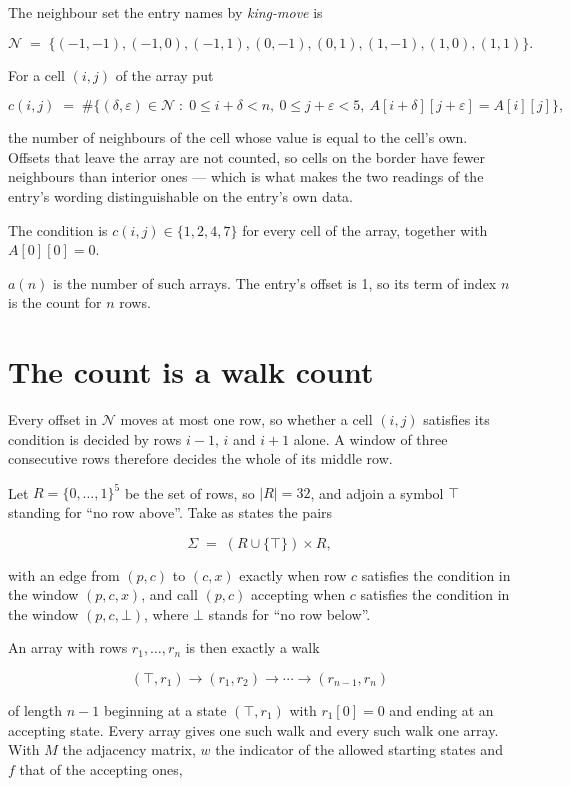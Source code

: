 \documentclass[11pt]{article}
\theoremstyle{definition}
\begin{document}
The neighbour set the entry names by {\itshape king-move} is

\[\mathcal{N} \;=\; \{(-1,-1), (-1,0), (-1,1), (0,-1), (0,1), (1,-1), (1,0), (1,1)\}.\]

For a cell $(i,j)$ of the array put

\[c(i,j) \;=\; \#\bigl\{(\delta,\varepsilon)\in\mathcal{N} \;:\; 0\le i+\delta<n,\ 0\le j+\varepsilon<5,\ A[i+\delta][j+\varepsilon] = A[i][j]\bigr\},\]

the number of neighbours of the cell whose value is equal to the cell's own. Offsets that leave the array are not counted, so cells on the border have fewer neighbours than interior ones --- which is what makes the two readings of the entry's wording distinguishable on the entry's own data.

The condition is $c(i,j) \in \{1, 2, 4, 7\}$ for every cell of the array, together with $A[0][0]=0$.

$a(n)$ is the number of such arrays. The entry's offset is 1, so its term of index $n$ is the count for $n$ rows.

\section{The count is a walk count}

Every offset in $\mathcal{N}$ moves at most one row, so whether a cell $(i,j)$ satisfies its condition is decided by rows $i-1$, $i$ and $i+1$ alone. A window of three consecutive rows therefore decides the whole of its middle row.

Let $R = \{0,\dots,1\}^{5}$ be the set of rows, so $|R| = 32$, and adjoin a symbol $\top$ standing for ``no row above''. Take as states the pairs

\[\Sigma \;=\; (R \cup \{\top\}) \times R,\]

with an edge from $(p,c)$ to $(c,x)$ exactly when row $c$ satisfies the condition in the window $(p,c,x)$, and call $(p,c)$ accepting when $c$ satisfies the condition in the window $(p,c,\bot)$, where $\bot$ stands for ``no row below''.

An array with rows $r_1,\dots,r_n$ is then exactly a walk

\[(\top,r_1) \to (r_1,r_2) \to \cdots \to (r_{n-1},r_n)\]

of length $n-1$ beginning at a state $(\top,r_1)$ with $r_1[0]=0$ and ending at an accepting state. Every array gives one such walk and every such walk one array. With $M$ the adjacency matrix, $w$ the indicator of the allowed starting states and $f$ that of the accepting ones,
\end{document}
